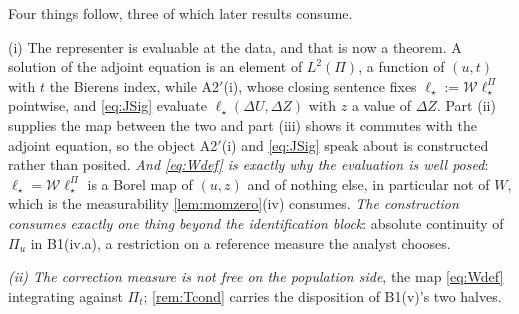 \begin{remark}\label{rem:adjointreconcile}
Four things follow, three of which later results consume.

(i) The representer is evaluable at the data, and that is now a theorem. A solution of the adjoint
equation is an element of $L^{2}(\Pi)$, a function of $(u,t)$ with $t$ the Bierens index, while
A2$'$(i), whose closing sentence fixes $\ell_\star:=\mathcal W\ell^\Pi_\star$ pointwise, and
\eqref{eq:JSig} evaluate $\ell_\star(\Delta U,\Delta Z)$ with $z$ a value of $\Delta Z$. Part (ii)
supplies the map between the two and part (iii) shows it commutes with the adjoint equation, so the object
A2$'$(i) and \eqref{eq:JSig} speak about is constructed rather than posited. \emph{And \eqref{eq:Wdef} is
exactly why the evaluation is well posed}: $\ell_\star=\mathcal W\ell^\Pi_\star$ is a Borel map of
$(u,z)$ and of nothing else, in particular not of $W$, which is the measurability
\cref{lem:momzero}\textup{(iv)} consumes. \emph{The construction consumes exactly one thing beyond the
identification block}: absolute continuity of $\Pi_u$ in B1(iv.a), a restriction on a reference
measure the analyst chooses.

\emph{(ii) The correction measure is not free \textup{on the population side}}, the map \eqref{eq:Wdef}
integrating against $\Pi_t$; \cref{rem:Tcond} carries the disposition of B1(v)'s two halves.


\end{remark}
